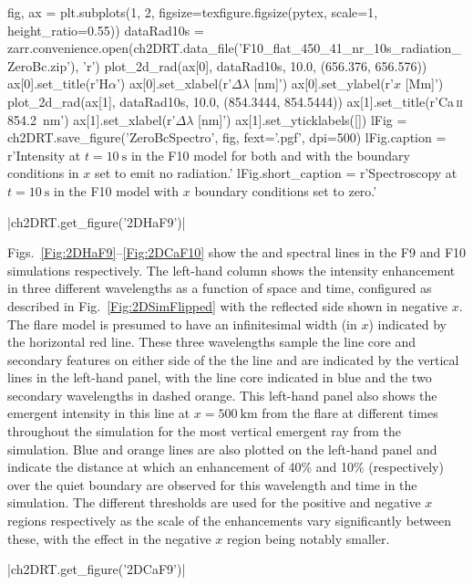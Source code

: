 \begin{pycode}[2DRT]
fig, ax = plt.subplots(1, 2, figsize=texfigure.figsize(pytex, scale=1, height_ratio=0.55))
dataRad10s = zarr.convenience.open(ch2DRT.data_file('F10_flat_450_41_nr_10s_radiation_ZeroBc.zip'), 'r')
plot_2d_rad(ax[0], dataRad10s, 10.0, (656.376, 656.576))
ax[0].set_title(r'H$\alpha$')
ax[0].set_xlabel(r'$\Delta\lambda$ [nm]')
ax[0].set_ylabel(r'$x$ [Mm]')
plot_2d_rad(ax[1], dataRad10s, 10.0, (854.3444, 854.5444))
ax[1].set_title(r'Ca\,\textsc{ii} \SI{854.2}{\nano\metre}')
ax[1].set_xlabel(r'$\Delta\lambda$ [nm]')
ax[1].set_yticklabels([])
lFig = ch2DRT.save_figure('ZeroBcSpectro', fig, fext='.pgf', dpi=500)
lFig.caption = r'Intensity at $t=\SI{10}{\second}$ in the F10 model for both \Ha{} and \CaLine{} with the boundary conditions in $x$ set to emit no radiation.'
lFig.short_caption = r'Spectroscopy at $t=\SI{10}{\second}$ in the F10 model with $x$ boundary conditions set to zero.'
\end{pycode}

\py[2DRT]|ch2DRT.get_figure('2DHaF9')|

Figs.~\ref{Fig:2DHaF9}--\ref{Fig:2DCaF10} show the \Ha{} and \CaLine{} spectral lines in the F9 and F10 simulations respectively.
The left-hand column shows the intensity enhancement in three different wavelengths as a function of space and time, configured as described in Fig.~\ref{Fig:2DSimFlipped} with the reflected side shown in negative $x$.
The flare model is presumed to have an infinitesimal width (in $x$) indicated by the horizontal red line.
These three wavelengths sample the line core and secondary features on either side of the the line and are indicated by the vertical lines in the left-hand panel, with the line core indicated in blue and the two secondary wavelengths in dashed orange.
This left-hand panel also shows the emergent intensity in this line at $x=\SI{500}{\kilo\metre}$ from the flare at different times throughout the simulation for the most vertical emergent ray from the simulation.
Blue and orange lines are also plotted on the left-hand panel and indicate the distance at which an enhancement of 40\% and 10\% (respectively) over the quiet boundary are observed for this wavelength and time in the simulation.
The different thresholds are used for the positive and negative $x$ regions respectively as the scale of the enhancements vary significantly between these, with the effect in the negative $x$ region being notably smaller.

\py[2DRT]|ch2DRT.get_figure('2DCaF9')|

